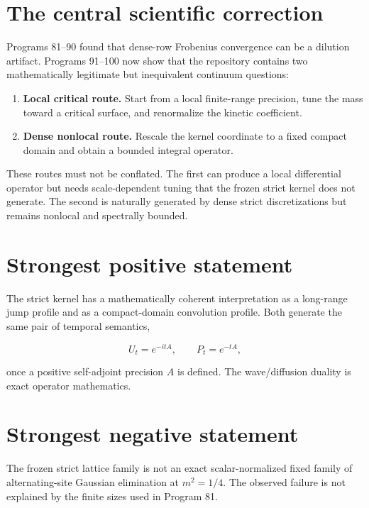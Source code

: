 \documentclass[11pt,a4paper,openany]{report}
\begin{document}
\section{The central scientific correction}

Programs 81--90 found that dense-row Frobenius convergence can be a dilution artifact. Programs 91--100 now show that the repository contains two mathematically legitimate but inequivalent continuum questions:

\begin{enumerate}
\item 
\textbf{Local critical route.} Start from a local finite-range precision, tune the mass toward a critical surface, and renormalize the kinetic coefficient.

\item 
\textbf{Dense nonlocal route.} Rescale the kernel coordinate to a fixed compact domain and obtain a bounded integral operator.

\end{enumerate}

These routes must not be conflated. The first can produce a local differential operator but needs scale-dependent tuning that the frozen strict kernel does not generate. The second is naturally generated by dense strict discretizations but remains nonlocal and spectrally bounded.

\section{Strongest positive statement}

The strict kernel has a mathematically coherent interpretation as a long-range jump profile and as a compact-domain convolution profile. Both generate the same pair of temporal semantics,

\[
U_t=e^{-itA},
\qquad
P_t=e^{-tA},
\]

once a positive self-adjoint precision \(A\) is defined. The wave/\allowbreak{}diffusion duality is exact operator mathematics.

\section{Strongest negative statement}

The frozen strict lattice family is not an exact scalar-normalized fixed family of alternating-site Gaussian elimination at \(m^2=1/4\). The observed failure is not explained by the finite sizes used in Program 81.
\end{document}
